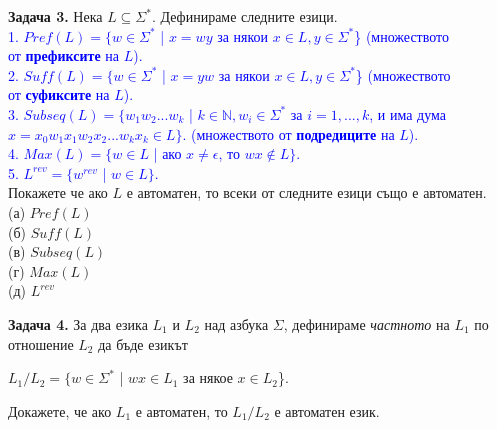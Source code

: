 \documentclass[openany]{book}
\begin{document}
        \textbf{Задача 3.} Нека $L \subseteq \Sigma^*$. Дефинираме следните езици. \\
        \textcolor{blue}{\hspace{10pt} 1. $Pref(L) = \{w \in \Sigma^*$ | $x = wy$ за някои $x \in L, y \in \Sigma^*$\}
        (множеството \\ \hspace{22pt} от \textbf{префиксите} на $L$). \\
        \hspace{10pt} 2. $Suff(L) = \{w \in \Sigma^*$ | $x = yw$ за някои $x \in L, y \in \Sigma^*$\}
        (множеството \\ \hspace{22pt} от \textbf{суфиксите} на $L$). \\
        \hspace{10pt} 3. $Subseq(L) = \{w_1w_2...w_k$ | $k \in \mathbb{N}, w_i \in \Sigma^*$ за $i = 1,...,k$,
        и има дума \\ \hspace{22pt} $x = x_0w_1x_1w_2x_2...w_kx_k \in L\}$. (множеството от \textbf{подредиците}
        на $L$). \\
        \hspace{10pt} 4. $Max(L) = \{w \in L$ | ако $x \neq \epsilon$, то $wx \notin L\}$. \\
        \hspace{10pt} 5. $L^{rev} = \{w^{rev}$ | $w \in L\}$.} \\
        Покажете че ако $L$ е автоматен, то всеки от следните езици също е автоматен. \\
        (а) $Pref(L)$ \\
        (б) $Suff(L)$ \\
        (в) $Subseq(L)$ \\
        (г) $Max(L)$ \\
        (д) $L^{rev}$
    
        \vspace{15pt}
    
        \textbf{Задача 4.} За два езика $L_1$ и $L_2$ над азбука $\Sigma$, дефинираме 
        \textit{частното} на $L_1$ по отношение $L_2$ да бъде езикът 
        \begin{center}
          $L_1/L_2 = \{w \in \Sigma^*$ | $wx \in L_1$ за някое $x \in L_2$\}.
        \end{center}
        Докажете, че ако $L_1$ е автоматен, то $L_1/L_2$ е автоматен език.
    
    \vspace{25pt}
    
\end{document}
